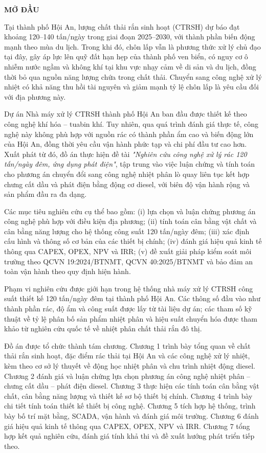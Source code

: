 \documentclass[../main.tex]{subfiles}
\begin{document}
\begin{center}
    \Large{\textbf{MỞ ĐẦU}}
\end{center}
\vspace{0.5cm}

Tại thành phố Hội An, lượng chất thải rắn sinh hoạt (CTRSH) dự báo đạt khoảng 120--140 tấn/ngày trong giai đoạn 2025--2030, với thành phần biến động mạnh theo mùa du lịch. Trong khi đó, chôn lấp vẫn là phương thức xử lý chủ đạo tại đây, gây áp lực lên quỹ đất hạn hẹp của thành phố ven biển, có nguy cơ ô nhiễm nước ngầm và không khí tại khu vực nhạy cảm về di sản và du lịch, đồng thời bỏ qua nguồn năng lượng chứa trong chất thải. Chuyển sang công nghệ xử lý nhiệt có khả năng thu hồi tài nguyên và giảm mạnh tỷ lệ chôn lấp là yêu cầu đối với địa phương này.

Dự án Nhà máy xử lý CTRSH thành phố Hội An ban đầu được thiết kế theo công nghệ khí hóa -- tuabin khí. Tuy nhiên, qua quá trình đánh giá thực tế, công nghệ này không phù hợp với nguồn rác có thành phần ẩm cao và biến động lớn của Hội An, đồng thời yêu cầu vận hành phức tạp và chi phí đầu tư cao hơn. Xuất phát từ đó, đồ án thực hiện đề tài \textit{"Nghiên cứu công nghệ xử lý rác 120 tấn/ngày đêm, ứng dụng phát điện"}, tập trung vào việc luận chứng và tính toán cho phương án chuyển đổi sang công nghệ nhiệt phân lò quay liên tục kết hợp chưng cất dầu và phát điện bằng động cơ diesel, với biên độ vận hành rộng và sản phẩm đầu ra đa dạng.

Các mục tiêu nghiên cứu cụ thể bao gồm: (i) lựa chọn và luận chứng phương án công nghệ phù hợp với điều kiện địa phương; (ii) tính toán cân bằng vật chất và cân bằng năng lượng cho hệ thống công suất 120 tấn/ngày đêm; (iii) xác định cấu hình và thông số cơ bản của các thiết bị chính; (iv) đánh giá hiệu quả kinh tế thông qua CAPEX, OPEX, NPV và IRR; (v) đề xuất giải pháp kiểm soát môi trường theo QCVN 19:2024/BTNMT, QCVN 40:2025/BTNMT và bảo đảm an toàn vận hành theo quy định hiện hành.

Phạm vi nghiên cứu được giới hạn trong hệ thống nhà máy xử lý CTRSH công suất thiết kế 120 tấn/ngày đêm tại thành phố Hội An. Các thông số đầu vào như thành phần rác, độ ẩm và công suất được lấy từ tài liệu dự án; các tham số kỹ thuật về tỷ lệ phân bố sản phẩm nhiệt phân và hiệu suất chuyển hóa được tham khảo từ nghiên cứu quốc tế về nhiệt phân chất thải rắn đô thị.

Đồ án được tổ chức thành tám chương. Chương 1 trình bày tổng quan về chất thải rắn sinh hoạt, đặc điểm rác thải tại Hội An và các công nghệ xử lý nhiệt, kèm theo cơ sở lý thuyết về động học nhiệt phân và chu trình nhiệt động diesel. Chương 2 đánh giá và luận chứng lựa chọn phương án công nghệ nhiệt phân -- chưng cất dầu -- phát điện diesel. Chương 3 thực hiện các tính toán cân bằng vật chất, cân bằng năng lượng và thiết kế sơ bộ thiết bị chính. Chương 4 trình bày chi tiết tính toán thiết kế thiết bị công nghệ. Chương 5 tích hợp hệ thống, trình bày bố trí mặt bằng, SCADA, vận hành và đánh giá môi trường. Chương 6 đánh giá hiệu quả kinh tế thông qua CAPEX, OPEX, NPV và IRR. Chương 7 tổng hợp kết quả nghiên cứu, đánh giá tính khả thi và đề xuất hướng phát triển tiếp theo.
\end{document}

